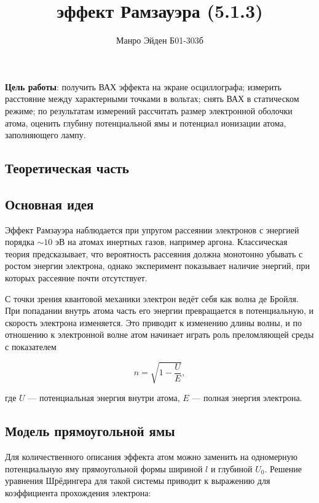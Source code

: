 \documentclass[a4paper,12pt]{article} %
\title{\textbf{эффект Рамзауэра} (5.1.3)}
\author{Манро Эйден Б01-303б}
\date{}
\begin{document}
\maketitle

\noindent \textbf{Цель работы}: получить ВАХ эффекта на экране осциллографа; измерить расстояние между характерными точками в вольтах; снять ВАХ в статическом режиме; по результатам измерений рассчитать размер электронной оболочки атома, оценить глубину потенциальной ямы и потенциал ионизации атома, заполняющего лампу.

\begin{center}
\section*{Теоретическая часть}
\end{center}
    
\subsection*{Основная идея}

Эффект Рамзауэра наблюдается при упругом рассеянии электронов с энергией порядка $\sim 10$ эВ на атомах инертных газов, например аргона.
Классическая теория предсказывает, что вероятность рассеяния должна монотонно убывать с ростом энергии электрона, однако эксперимент показывает наличие энергий, при которых рассеяние почти отсутствует.

С точки зрения квантовой механики электрон ведёт себя как волна де Бройля. При попадании внутрь атома часть его энергии превращается в потенциальную, и скорость электрона изменяется. Это приводит к изменению длины волны, и по отношению к электронной волне атом начинает играть роль преломляющей среды с показателем

\begin{equation}
    n = \sqrt{1 - \frac{U}{E}},
\end{equation}

где $U$ — потенциальная энергия внутри атома, $E$ — полная энергия электрона.

\subsection*{Модель прямоугольной ямы}

Для количественного описания эффекта атом можно заменить на одномерную потенциальную яму прямоугольной формы шириной $l$ и глубиной $U_0$.
Решение уравнения Шрёдингера для такой системы приводит к выражению для коэффициента прохождения электрона:
\end{document}

